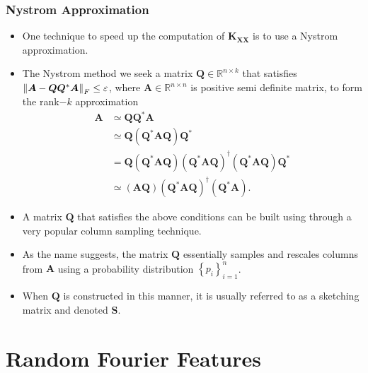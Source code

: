 \documentclass[9pt,hyperref={pdfpagelabels=false},xcolor=table]{beamer}
\begin{document}
\begin{frame}
    \frametitle{Nystrom Approximation}
    \begin{itemize}
        \item One technique to speed up the computation of $\bm{K_{XX}}$ is to use a Nystrom approximation.
        \item The Nystrom method we seek a matrix $\bm{Q}\in \mathbb{R}^{n \times k}$ that satisfies $\left\lVert\bm{A} - \bm{Q} \bm{Q}^{\ast} \bm{A}\right\rVert_{F} \leq \varepsilon$, where $\bm{A} \in \mathbb{R}^{n \times n}$ is positive semi definite matrix, to form the rank$-k$ approximation
              \begin{align*}
                  \bm{A} & \simeq \bm{Q} \bm{Q}^{\ast} \bm{A}                                                                                                                                \\
                         & \simeq \bm{Q} \left( \bm{Q}^{\ast} \bm{A} \bm{Q} \right) \bm{Q}^{\ast}                                                                                            \\
                         & = \bm{Q} \left( \bm{Q}^{\ast} \bm{A} \bm{Q} \right) \left( \bm{Q}^{\ast} \bm{A} \bm{Q} \right)^{\dagger} \left( \bm{Q}^{\ast} \bm{A} \bm{Q} \right) \bm{Q}^{\ast} \\
                         & \simeq \left( \bm{A} \bm{Q} \right) \left( \bm{Q}^{\ast} \bm{A} \bm{Q} \right)^{\dagger} \left( \bm{Q}^{\ast} \bm{A} \right).
              \end{align*}
        \item A matrix $\bm{Q}$ that satisfies the above conditions can be built using through a very popular column sampling technique.
        \item As the name suggests, the matrix $\bm{Q}$ essentially samples and rescales columns from $\bm{A}$ using a probability distribution $\left\{ p_i \right\}_{i=1}^{n}$.
        \item When $\bm{Q}$ is constructed in this manner, it is usually referred to as a sketching matrix and denoted $\bm{S}$.
    \end{itemize}
\end{frame}

\section{Random Fourier Features}
\end{document}

